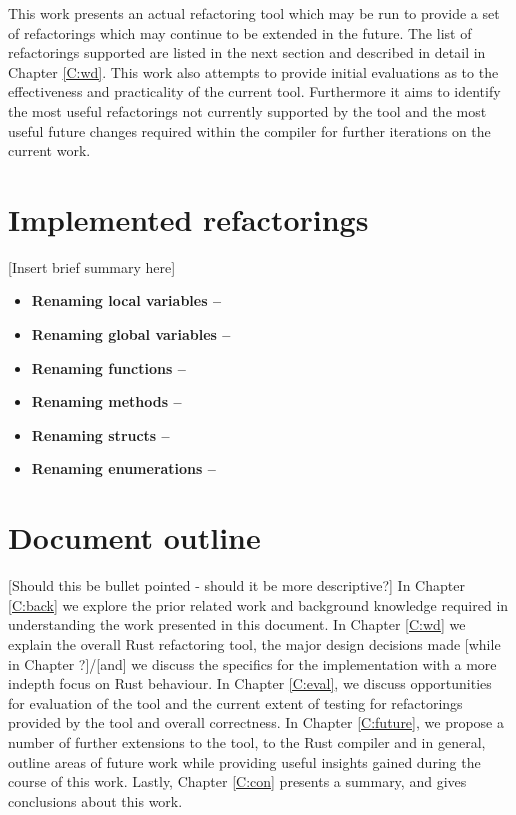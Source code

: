 This work presents an actual refactoring tool which may be run to provide a set of refactorings which may continue to be extended in the future. The list of refactorings supported are listed in the next section and described in detail in Chapter \ref{C:wd}. This work also attempts to provide initial evaluations as to the effectiveness and practicality of the current tool. Furthermore it aims to identify the most useful refactorings not currently supported by the tool and the most useful future changes required within the compiler for further iterations on the current work.

\section{Implemented refactorings}\label{S:implemented}
[Insert brief summary here]

\begin{itemize}
\item \bf{Renaming local variables} --
\item \bf{Renaming global variables} --
\item \bf{Renaming functions} --
\item \bf{Renaming methods} --
\item \bf{Renaming structs} -- 
\item \bf{Renaming enumerations} --
\end{itemize}

\section{Document outline}\label{S:outline}
[Should this be bullet pointed - should it be more descriptive?]
In Chapter \ref{C:back} we explore the prior related work and background knowledge required in understanding the work presented in this document. In Chapter \ref{C:wd} we explain the overall Rust refactoring tool, the major design decisions made [while in Chapter ?]/[and] we discuss the specifics for the implementation with a more indepth focus on Rust behaviour. In Chapter \ref{C:eval}, we discuss opportunities for evaluation of the tool and the current extent of testing for refactorings provided by the tool and overall correctness. In Chapter \ref{C:future}, we propose a number of further extensions to the tool, to the Rust compiler and in general, outline areas of future work while providing useful insights gained during the course of this work. Lastly, Chapter \ref{C:con} presents a summary, and gives conclusions about this work.